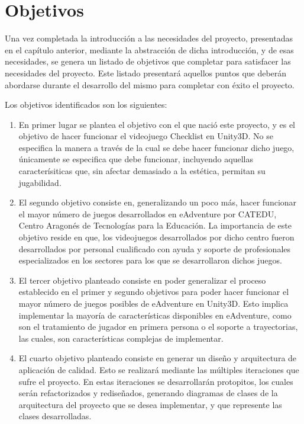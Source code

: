 \chapter{Objetivos}
\label{objetivos}

Una vez completada la introducción a las necesidades del proyecto, presentadas en el capítulo anterior, mediante la abstracción de dicha introducción, y de esas necesidades, se genera un listado de objetivos que completar para satisfacer las necesidades del proyecto. Este listado presentará aquellos puntos que deberán abordarse durante el desarrollo del mismo para completar con éxito el proyecto.

Los objetivos identificados son los siguientes:
\begin{enumerate}
	\item En primer lugar se plantea el objetivo con el que nació este proyecto, y es el objetivo de hacer funcionar el videojuego Checklist en Unity3D. No se especifica la manera a través de la cual se debe hacer funcionar dicho juego, únicamente se especifica que debe funcionar, incluyendo aquellas caracterísiticas que, sin afectar demasiado a la estética, permitan su jugabilidad.
	
	\item El segundo objetivo consiste en, generalizando un poco más, hacer funcionar el mayor número de juegos desarrollados en eAdventure por CATEDU, Centro Aragonés de Tecnologías para la Educación. La importancia de este objetivo reside en que, los videojuegos desarrollados por dicho centro fueron desarrollados por personal cualificado con ayuda y soporte de profesionales especializados en los sectores para los que se desarrollaron dichos juegos.
	
	\item El tercer objetivo planteado consiste en poder generalizar el proceso establecido en el primer y segundo objetivos para poder hacer funcionar el mayor número de juegos posibles de eAdventure en Unity3D. Esto implica implementar la mayoría de características disponibles en eAdventure, como son el tratamiento de jugador en primera persona o el soporte a trayectorias, las cuales, son características complejas de implementar.
	
	\item El cuarto objetivo planteado consiste en generar un diseño y arquitectura de aplicación de calidad. Esto se realizará mediante las múltiples iteraciones que sufre el proyecto. En estas iteraciones se desarrollarán protopitos, los cuales serán refactorizados y rediseñados, generando diagramas de clases de la arquitectura del proyecto que se desea implementar, y que represente las clases desarrolladas.
	

\end{enumerate}
